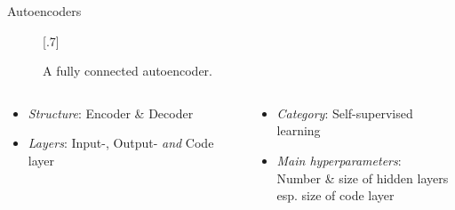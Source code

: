 \documentclass[usenames,dvipsnames,Nike,mathserif]{tuberlinbeamer}
\begin{document}
\begin{frame}[fragile]{Autoencoders}
	\begin{figure}
		\scalebox{.7}[.7]{}
		\caption{A fully connected autoencoder.}
	\end{figure}
	\vspace{-3em}
	\begin{columns}
		\begin{column}{.5\textwidth}
			\begin{itemize}
				\item <2->\emph{Structure}: Encoder \& Decoder
				\item <2->\emph{Layers}: Input-, Output- \emph{and} Code layer
			\end{itemize}
		\end{column}
		\begin{column}{.5\textwidth}
			\begin{itemize}
				\item <2->\emph{Category}: Self-supervised learning
				\item <2->\emph{Main hyperparameters}:\\
					 	Number \& size of hidden layers\\
					 	esp. size of code layer
			\end{itemize}
		\end{column}
	\end{columns}
\end{frame}
\end{document}

